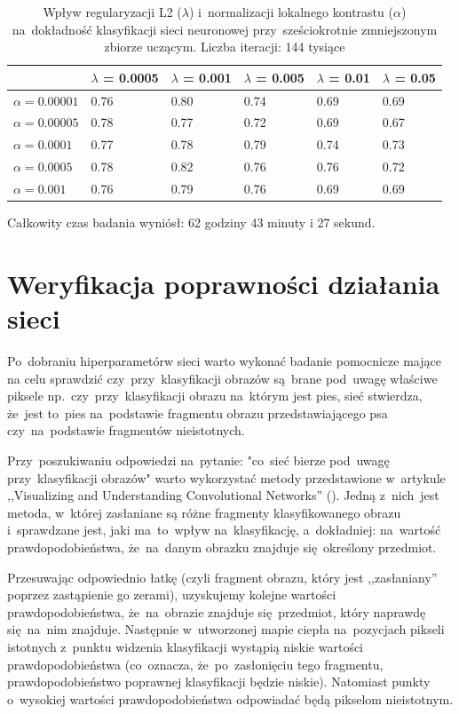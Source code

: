 \begin{table}[H]
    \centering
    \begin{tabular}{|l|l|l|l|l|l|}
      \hline
                       & $\lambda$ = 0.0005 & $\lambda$ = 0.001 & $\lambda$ = 0.005 & $\lambda$ = 0.01 & $\lambda$ = 0.05 \\
      \hline
      $\alpha=0.00001$ & 0.76 & 0.80 & 0.74 & 0.69 & 0.69 \\
      \hline
      $\alpha=0.00005$ & 0.78 & 0.77 & 0.72 & 0.69 & 0.67 \\
      \hline
      $\alpha=0.0001$  & 0.77 & 0.78 & 0.79 & 0.74 & 0.73 \\
      \hline
      $\alpha=0.0005$  & 0.78 & 0.82 & 0.76 & 0.76 & 0.72 \\
      \hline
      $\alpha=0.001$   & 0.76 & 0.79 & 0.76 & 0.69 & 0.69 \\
      \hline
    \end{tabular}

    \caption{Wpływ regularyzacji L2 ($\lambda$) i~normalizacji lokalnego kontrastu ($\alpha$) na~dokładność klasyfikacji
    sieci neuronowej przy~sześciokrotnie zmniejszonym zbiorze uczącym. Liczba iteracji: 144 tysiące}
    \label{table:wyniki3}
\end{table}

Całkowity czas badania wyniósł: 62 godziny 43 minuty i 27 sekund.

\section{Weryfikacja poprawności działania sieci} \label{sec:weryfikacja-poprawnosci}
Po~dobraniu hiperparametórw sieci warto wykonać badanie pomocnicze mające na celu sprawdzić czy~przy~klasyfikacji
obrazów są~brane pod~uwagę właściwe piksele np.~czy~przy~klasyfikacji obrazu na~którym jest pies, sieć stwierdza,
że~jest to~pies na~podstawie fragmentu obrazu przedstawiającego psa czy~na~podstawie fragmentów nieistotnych.

Przy~poszukiwaniu odpowiedzi na~pytanie: "co~sieć bierze pod~uwagę przy~klasyfikacji obrazów" warto wykorzystać
metody przedstawione w~artykule ,,Visualizing and Understanding Convolutional Networks'' (\cite{understanding-cnn}).
Jedną z~nich~jest metoda, w~której zasłaniane są różne fragmenty klasyfikowanego obrazu i~sprawdzane jest,
jaki ma~to~wpływ na~klasyfikację, a~dokładniej: na~wartość prawdopodobieństwa, że~na~danym obrazku znajduje
się~określony przedmiot.

Przesuwając odpowiednio łatkę (czyli fragment obrazu, który jest ,,zasłaniany'' poprzez zastąpienie go zerami),
uzyskujemy kolejne wartości prawdopodobieństwa, że~na~obrazie znajduje się~przedmiot, który naprawdę się~na~nim
znajduje. Następnie w~utworzonej mapie ciepła na~pozycjach pikseli istotnych z~punktu widzenia klasyfikacji wystąpią
niskie wartości prawdopodobieństwa (co~oznacza, że~po~zasłonięciu tego fragmentu, prawdopodobieństwo poprawnej
klasyfikacji będzie niskie). Natomiast punkty o~wysokiej wartości prawdopodobieństwa odpowiadać będą pikselom
nieistotnym.


